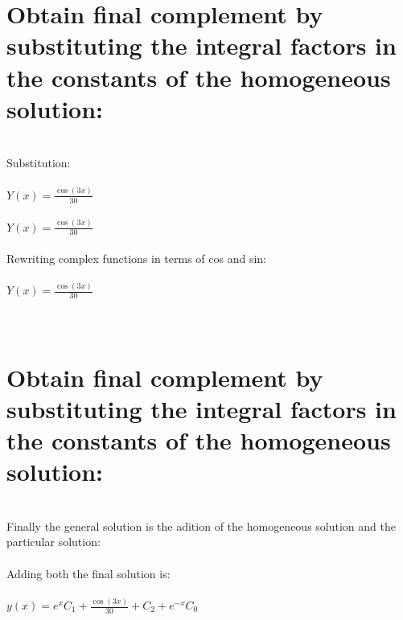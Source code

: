 \documentclass{article}
\begin{document}
\section{Obtain final complement by substituting the integral factors in the constants of the homogeneous solution:}\\
Substitution: \\ \\$Y(x) = \frac{\cos{\left(3 x \right)}}{30}$\\ \\$Y(x) = \frac{\cos{\left(3 x \right)}}{30}$\\ \\Rewriting complex functions in terms of cos and sin: \\ \\$Y(x) = \frac{\cos{\left(3 x \right)}}{30}$\\ \\\\
\section{Obtain final complement by substituting the integral factors in the constants of the homogeneous solution:}\\
Finally the general solution is the adition of the homogeneous solution and the particular solution:\\ \\Adding both the final solution is: \\ \\$y(x) = e^{x} {C}_{1} + \frac{\cos{\left(3 x \right)}}{30} + {C}_{2} + e^{- x} {C}_{0}$\\ \\\\
\end{document}

